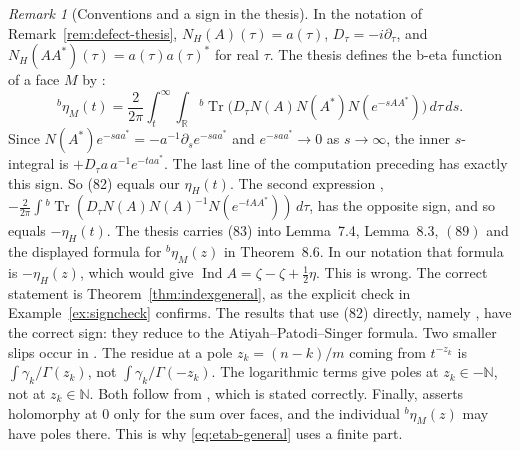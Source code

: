 \documentclass[11pt,oneside,reqno]{article}
\DeclareMathOperator{\Tr}{Tr}
\theoremstyle{plain}
\theoremstyle{definition}
\theoremstyle{remark}
\newtheorem{remark}[theorem]{Remark}
\begin{document}
\begin{remark}[Conventions and a sign in the thesis]\label{rem:thesis-sign}
In the notation of Remark~\ref{rem:defect-thesis}, \(N_H(A)(\tau)=a(\tau)\),
\(D_\tau=-i\partial_\tau\), and \(N_H(AA^*)(\tau)=a(\tau)a(\tau)^*\) for real
\(\tau\). The thesis defines the b-eta function of a face \(M\) by
\cite[(82)]{LoyaThesis}:
\[
 {}^b\eta_M(t)=\frac2{2\pi}\int_t^\infty\int_{\mathbb R}
 {}^b\Tr\bigl(D_\tau N(A)N(A^*)N(e^{-sAA^*})\bigr)\,d\tau\,ds .
\]
Since \(N(A^*)e^{-saa^*}=-a^{-1}\partial_se^{-saa^*}\) and
\(e^{-saa^*}\to0\) as \(s\to\infty\), the inner \(s\)-integral is
\(+D_\tau a\,a^{-1}e^{-taa^*}\). The last line of the computation preceding
\cite[Lemma~7.3]{LoyaThesis} has exactly this sign. So (82) equals our
\(\eta_H(t)\). The second expression \cite[(83)]{LoyaThesis},
\(-\frac2{2\pi}\int{}^b\Tr(D_\tau N(A)N(A)^{-1}N(e^{-tAA^*}))\,d\tau\), has the
opposite sign, and so equals \(-\eta_H(t)\). The thesis carries (83) into
Lemma~7.4, Lemma~8.3, \((89)\) and the displayed formula for
\({}^b\eta_M(z)\) in Theorem~8.6. In our notation that formula is
\(-\eta_H(z)\), which would give
\(\operatorname{Ind}A=\zeta-\zeta+\frac12\eta\). This is wrong. The correct
statement is Theorem~\ref{thm:indexgeneral}, as the explicit check in
Example~\ref{ex:signcheck} confirms. The results that use (82) directly,
namely \cite[Lemma~7.9, Thms.~7.10, 8.7, Cor.~8.8]{LoyaThesis}, have the
correct sign: they reduce to the Atiyah--Patodi--Singer formula. Two
smaller slips occur in \cite[Cor.~5.12, Thm.~8.2]{LoyaThesis}. The residue
at a pole \(z_k=(n-k)/m\) coming from \(t^{-z_k}\) is
\(\int\gamma_k/\Gamma(z_k)\), not \(\int\gamma_k/\Gamma(-z_k)\). The logarithmic
terms give poles at \(z_k\in-\mathbb N\), not at \(z_k\in\mathbb N\). Both
follow from \cite[Lemma~5.10]{LoyaThesis}, which is stated correctly.
Finally, \cite[Lemma~8.4]{LoyaThesis} asserts holomorphy at \(0\) only for
the sum over faces, and the individual \({}^b\eta_M(z)\) may have poles
there. This is why \eqref{eq:etab-general} uses a finite part.
\end{remark}
\end{document}
